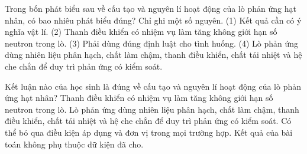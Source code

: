 \begin{ex}
Trong bốn phát biểu sau về cấu tạo và nguyên lí hoạt động của lò phản ứng hạt nhân, có bao nhiêu phát biểu đúng? Chỉ ghi một số nguyên. (1) Kết quả cần có ý nghĩa vật lí. (2) Thanh điều khiển có nhiệm vụ làm tăng không giới hạn số neutron trong lò. (3) Phải dùng đúng định luật cho tình huống. (4) Lò phản ứng dùng nhiên liệu phân hạch, chất làm chậm, thanh điều khiển, chất tải nhiệt và hệ che chắn để duy trì phản ứng có kiểm soát.
\end{ex}

\begin{ex}
Kết luận nào của học sinh là đúng về cấu tạo và nguyên lí hoạt động của lò phản ứng hạt nhân?
\choice
{Thanh điều khiển có nhiệm vụ làm tăng không giới hạn số neutron trong lò.}
{\True Lò phản ứng dùng nhiên liệu phân hạch, chất làm chậm, thanh điều khiển, chất tải nhiệt và hệ che chắn để duy trì phản ứng có kiểm soát.}
{Có thể bỏ qua điều kiện áp dụng và đơn vị trong mọi trường hợp.}
{Kết quả của bài toán không phụ thuộc dữ kiện đã cho.}
\end{ex}


